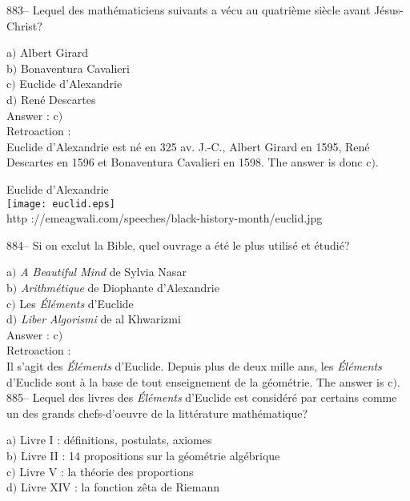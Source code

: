 ﻿\documentclass[letterpaper, 12pt]{article}
\begin{document}
883-- Lequel des math\'ematiciens suivants a v\'ecu au quatri\`eme
si\`ecle avant J\'esus-Christ?

a$)$ Albert Girard \\
b$)$ Bonaventura Cavalieri \\
c$)$ Euclide d'Alexandrie \\
d$)$ Ren\'e Descartes\\

Answer : c$)$\\

Retroaction :\\
Euclide d'Alexandrie est n\'e en 325 av. J.-C., Albert Girard en 1595,
Ren\'e Descartes en 1596 et Bonaventura Cavalieri en 1598. The answer is
donc c$)$.\\

        \begin{center}
        Euclide d'Alexandrie\\
    \texttt{[image: euclid.eps]}\\
        {\footnotesize http
://emeagwali.com/speeches/black-history-month/euclid.jpg}
    \end{center}

884-- Si on exclut la Bible, quel ouvrage a \'et\'e le plus
utilis\'e et \'etudi\'e?

a$)$ {\sl A Beautiful Mind} de Sylvia Nasar \\
b$)$ {\sl Arithm\'etique} de Diophante d'Alexandrie \\
c$)$ Les {\sl \'El\'ements} d'Euclide \\
d$)$ {\sl Liber Algorismi} de al Khwarizmi\\

Answer : c$)$\\

Retroaction :\\
Il s'agit des {\sl \'El\'ements} d'Euclide. Depuis plus de deux mille ans,
les {\sl \'El\'ements} d'Euclide sont \`a la base de tout enseignement de la
g\'eom\'etrie. The answer is c$)$.\\

885-- Lequel des livres des {\sl \'El\'ements} d'Euclide est
consid\'er\'e par certains comme un des grands chefs-d'oeuvre de la
litt\'erature math\'ematique?

a$)$ Livre I : d\'efinitions, postulats, axiomes \\
b$)$ Livre II : 14 propositions sur la g\'eom\'etrie alg\'ebrique \\
c$)$ Livre V : la th\'eorie des proportions \\
d$)$ Livre XIV : la fonction z\^eta de Riemann \\
\end{document}
